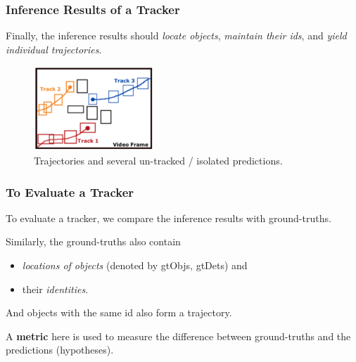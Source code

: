 \documentclass[slidetop, mathserif]{beamer}
\begin{document}
\begin{frame}
	\frametitle{Inference Results of a Tracker}

	Finally, the inference results should \emph{locate objects},
	\emph{maintain their ids},
	and \emph{yield individual trajectories}.

	\begin{figure}
		\includegraphics[height=90pt]{pics/fig1.png}
		\caption{Trajectories and several un-tracked / isolated predictions.}
	\end{figure}

\end{frame}

\begin{frame}
	\frametitle{To Evaluate a Tracker}

	To evaluate a tracker, we compare the inference results with ground-truths.

	\quad

	Similarly, the ground-truths also contain
	\begin{itemize}
	\item \emph{locations of objects} (denoted by gtObjs, gtDets) and
	\item their \emph{identities}.
	\end{itemize}
	And objects with the same id also form a trajectory.

	\quad

	A {\bf metric} here is used to measure the difference between
	ground-truths and the predictions (hypotheses).

\end{frame}
\end{document}
